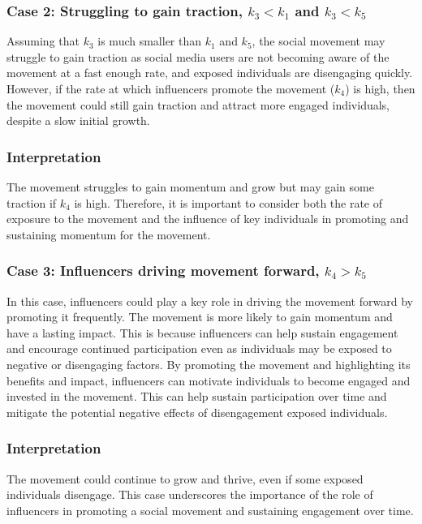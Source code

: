 \documentclass{article}
\begin{document}
    \subsubsection*{Case 2: Struggling to gain traction, $k_3 < k_1$ and $k_3 < k_5$}
    \begin{tcolorbox}
    Assuming that $k_3$ is much smaller than $k_1$ and $k_5$, the social movement may struggle to gain traction as social media users are not becoming aware of the movement at a fast enough rate, and exposed individuals are disengaging quickly. However, if the rate at which influencers promote the movement ($k_4$) is high, then the movement could still gain traction and attract more engaged individuals, despite a slow initial growth.
    \subsubsection*{Interpretation} The movement  struggles to gain momentum and grow but may gain some traction if $k_4$ is high. Therefore, it is important to consider both the rate of exposure to the movement and the influence of key individuals in promoting and sustaining momentum for the movement.
    \end{tcolorbox}
    
    \subsubsection*{Case 3: Influencers driving movement forward, $k_4 > k_5$} \normalfont
    \begin{tcolorbox}
     In this case, influencers could play a key role in driving the movement forward by promoting it frequently. The movement is more likely to gain momentum and have a lasting impact. This is because influencers can help sustain engagement and encourage continued participation even as individuals may be exposed to negative or disengaging factors. By promoting the movement and highlighting its benefits and impact, influencers can motivate individuals to become engaged and invested in the movement. This can help sustain participation over time and mitigate the potential negative effects of disengagement  exposed individuals.
    \subsubsection*{Interpretation}The movement could continue to grow and thrive, even if some exposed individuals disengage. This case underscores the importance of the role of influencers in promoting a social movement and sustaining engagement over time. 
    \end{tcolorbox}
\end{document}
